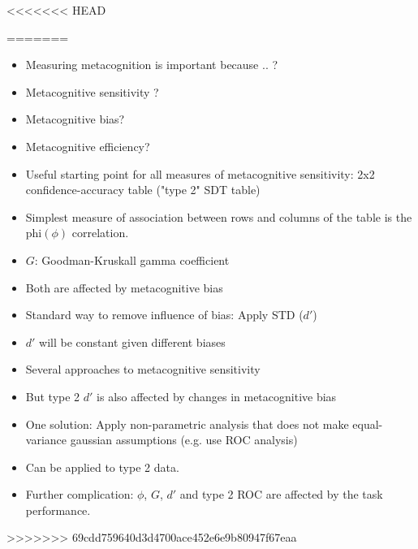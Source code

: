 \documentclass[../main/main.tex]{subfiles}
\begin{document}
<<<<<<< HEAD
	
=======
\begin{itemize}
	\item Measuring metacognition is important because .. ?
	\item Metacognitive sensitivity ?
	\item Metacognitive bias?
	\item Metacognitive efficiency?
	\item Useful starting point for all measures of metacognitive sensitivity: 2x2 confidence-accuracy table ("type 2" SDT table)
	\item Simplest measure of association between rows and columns of the table is the phi$(\phi)$ correlation.
	\item $G$: Goodman-Kruskall gamma coefficient
	\item Both are affected by metacognitive bias
	\item Standard way to remove influence of bias: Apply STD ($d'$)
	\item $d'$ will be constant given different biases
	\item Several approaches to metacognitive sensitivity
	\item But type 2 $d'$ is also affected by changes in metacognitive bias
	\item One solution: Apply non-parametric analysis that does not make equal-variance gaussian assumptions (e.g. use ROC analysis)
	\item Can be applied to type 2 data.
	\item Further complication: $\phi$, $G$, $d'$ and type 2 ROC are affected by the task performance.
\end{itemize}
>>>>>>> 69cdd759640d3d4700ace452e6e9b80947f67eaa
\end{document}
